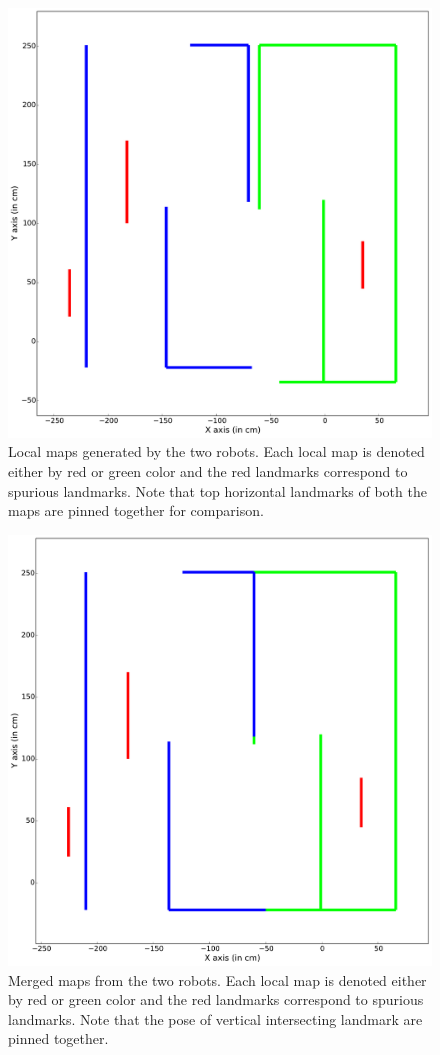 \begin{figure}
\centering
\includegraphics[scale=0.25]{./images/mmap3}
\caption[Map comparisons from the two robots ]{Local maps generated by the two robots. Each local map is denoted either by red or green color and the red landmarks correspond to spurious landmarks. Note that top horizontal landmarks of both the maps are pinned together for comparison.}
\label{mmap3}
\end{figure}

\begin{figure}
\centering
\includegraphics[scale=0.25]{./images/mmap4}
\caption[]{Merged maps from the two robots. Each local map is denoted either by red or green color and the red landmarks correspond to spurious landmarks. Note that the pose of vertical intersecting landmark are pinned together.}
\label{mmap4}
\end{figure}
